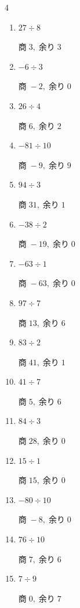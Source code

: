 \begin{multicols}{4}
\begin{enumerate}
  \item $27 \div 8$

        $商\; 3,\; 余り\; 3$

  \item $-6 \div 3$

        $商\; -2,\; 余り\; 0$

  \item $26 \div 4$

        $商\; 6,\; 余り\; 2$

  \item $-81 \div 10$

        $商\; -9,\; 余り\; 9$

\columnbreak %

  \item $94 \div 3$

        $商\; 31,\; 余り\; 1$

  \item $-38 \div 2$

        $商\; -19,\; 余り\; 0$

  \item $-63 \div 1$

        $商\; -63,\; 余り\; 0$

  \item $97 \div 7$

        $商\; 13,\; 余り\; 6$

  \item $83 \div 2$

        $商\; 41,\; 余り\; 1$

  \item $41 \div 7$

        $商\; 5,\; 余り\; 6$

  \item $84 \div 3$

        $商\; 28,\; 余り\; 0$

  \item $15 \div 1$

        $商\; 15,\; 余り\; 0$

  \item $-80 \div 10$

        $商\; -8,\; 余り\; 0$

  \item $76 \div 10$

        $商\; 7,\; 余り\; 6$

  \item $7 \div 9$

        $商\; 0,\; 余り\; 7$


\end{enumerate}
\end{multicols}
